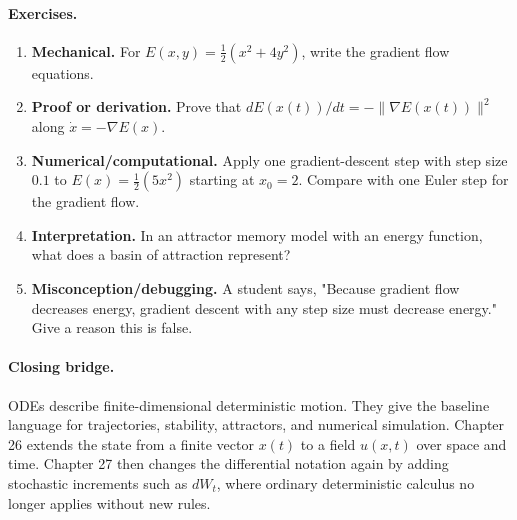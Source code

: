 \paragraph{Exercises.}
\begin{enumerate}[label=\textbf{25.4.\arabic*.}, leftmargin=*]
\item \textbf{Mechanical.} For \(E(x,y)=\frac12(x^2+4y^2)\), write the gradient flow equations.
\item \textbf{Proof or derivation.} Prove that \(dE(x(t))/dt=-\|\nabla E(x(t))\|^2\) along \(\dot x=-\nabla E(x)\).
\item \textbf{Numerical/computational.} Apply one gradient-descent step with step size \(0.1\) to \(E(x)=\frac12(5x^2)\) starting at \(x_0=2\). Compare with one Euler step for the gradient flow.
\item \textbf{Interpretation.} In an attractor memory model with an energy function, what does a basin of attraction represent?
\item \textbf{Misconception/debugging.} A student says, "Because gradient flow decreases energy, gradient descent with any step size must decrease energy." Give a reason this is false.
\end{enumerate}

\paragraph{Closing bridge.}
ODEs describe finite-dimensional deterministic motion. They give the baseline language for trajectories, stability, attractors, and numerical simulation. Chapter 26 extends the state from a finite vector \(x(t)\) to a field \(u(x,t)\) over space and time. Chapter 27 then changes the differential notation again by adding stochastic increments such as \(dW_t\), where ordinary deterministic calculus no longer applies without new rules.

\clearpage
